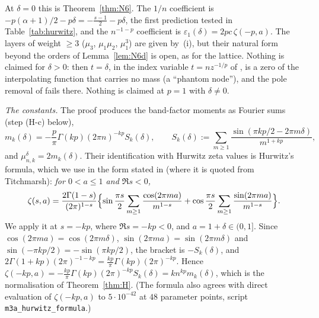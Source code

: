 At $\delta=0$ this is Theorem~\ref{thm:N6}. The $1/n$ coefficient is $-p(\alpha+1)/2-p\delta=-\frac{s-1}2-p\delta$, the first prediction tested
in Table~\ref{tab:hurwitz}, and the $n^{-1-p}$ coefficient is $\varepsilon_1(\delta)=2pc\,\zeta(-p,a)$. The layers of weight $\ge3$ ($\mu_3$,
$\mu_1\mu_2$, $\mu_1^3$) are given by~(i), but their natural form beyond the orders of Lemma~\ref{lem:N6d} is open, as for the lattice.
Nothing is claimed for $\delta>0$: then $t=\delta$, in the index variable $t=nz^{-1/p}$ of \cite{PaperII}, is a zero of the
interpolating function that carries no mass (a ``phantom node''), and the pole removal of \cite[Section~5]{PaperII} fails there.
Nothing is claimed at $p=1$ with $\delta\ne0$.

\emph{The constants.} The proof produces the band-factor moments as Fourier sums (step (H-c) below),
\begin{equation}\label{eq:fourier}
  m_k(\delta)=-\frac p\pi\Gamma(kp)(2\pi n)^{-kp}S_k(\delta),\qquad S_k(\delta):=\sum_{m\ge1}\frac{\sin(\pi kp/2-2\pi m\delta)}{m^{1+kp}} ,
\end{equation}
and $\mu^\delta_{n,k}=2m_k(\delta)$. Their identification with Hurwitz zeta values is Hurwitz's formula, which we use in the form
stated in \cite[Theorem~1.1]{DixitKumar} (where it is quoted from Titchmarsh): \emph{for $0<a\le1$ and $\Re s<0$,}
\[
  \zeta(s,a)=\frac{2\Gamma(1-s)}{(2\pi)^{1-s}}\Bigl\{\sin\frac{\pi s}2\sum_{m\ge1}\frac{\cos(2\pi ma)}{m^{1-s}}
  +\cos\frac{\pi s}2\sum_{m\ge1}\frac{\sin(2\pi ma)}{m^{1-s}}\Bigr\}.
\]
We apply it at $s=-kp$, where $\Re s=-kp<0$, and $a=1+\delta\in(0,1]$. Since $\cos(2\pi ma)=\cos(2\pi m\delta)$,
$\sin(2\pi ma)=\sin(2\pi m\delta)$ and $\sin(-\pi kp/2)=-\sin(\pi kp/2)$, the bracket is $-S_k(\delta)$, and
$2\Gamma(1+kp)(2\pi)^{-1-kp}=\frac{kp}\pi\Gamma(kp)(2\pi)^{-kp}$. Hence $\zeta(-kp,a)=-\frac{kp}\pi\Gamma(kp)(2\pi)^{-kp}S_k(\delta)=kn^{kp}m_k(\delta)$,
which is the normalisation of Theorem~\ref{thm:H}. (The formula also agrees with direct evaluation of $\zeta(-kp,a)$ to $5\cdot10^{-42}$
at $48$ parameter points, script \texttt{m3a\_hurwitz\_formula}.)

